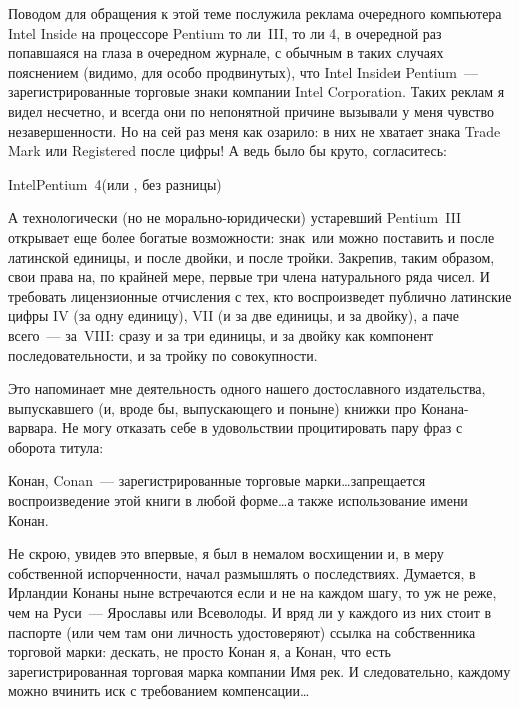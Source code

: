 Поводом для обращения к этой теме послужила реклама очередного компьютера Intel Inside на процессоре Pentium то ли~III, то ли 4, в очередной раз попавшаяся на глаза в очередном журнале, с обычным в таких случаях пояснением (видимо, для особо продвинутых), что Intel Inside\textregistered и Pentium\textregistered~--- зарегистрированные торговые знаки компании Intel Corporation. Таких реклам я видел несчетно, и всегда они по непонятной причине вызывали у меня чувство незавершенности. Но на сей раз меня как озарило: в них не хватает знака Trade Mark или Registered после цифры! А ведь было бы круто, согласитесь:
\begin{shadequote}{}
Intel\textregistered Pentium\textregistered~4\textregistered (или \texttrademark, без разницы)
\end{shadequote}
А технологически (но не морально-юридически) устаревший Pentium~III открывает еще более богатые возможности: знак~\textregistered или \texttrademark можно поставить и после латинской единицы, и после двойки, и после тройки. Закрепив, таким образом, свои права на, по крайней мере, первые три члена натурального ряда чисел. И требовать лицензионные отчисления с тех, кто воспроизведет публично латинские цифры IV (за одну единицу), VII (и за две единицы, и за двойку), а паче всего~--- за~VIII: сразу и за три единицы, и за двойку как компонент последовательности, и за тройку по совокупности.

Это напоминает мне деятельность одного нашего достославного издательства, выпускавшего (и, вроде бы, выпускающего и поныне) книжки про Конана-варвара. Не могу отказать себе в удовольствии процитировать пару фраз с оборота титула:

\begin{shadequote}{}
Конан\texttrademark, Conan\texttrademark~--- зарегистрированные торговые марки\dots запрещается воспроизведение этой книги в любой форме\dots а также использование имени Конан\texttrademark.
\end{shadequote}
Не скрою, увидев это впервые, я был в немалом восхищении и, в меру собственной испорченности, начал размышлять о последствиях. Думается, в Ирландии Конаны ныне встречаются если и не на каждом шагу, то уж не реже, чем на Руси~--- Ярославы или Всеволоды. И вряд ли у каждого из них стоит в паспорте (или чем там они личность удостоверяют) ссылка на собственника торговой марки: дескать, не просто Конан я, 
а Конан\texttrademark, что есть зарегистрированная торговая марка компании Имя рек. И следовательно, каждому можно вчинить иск с требованием компенсации\dots

